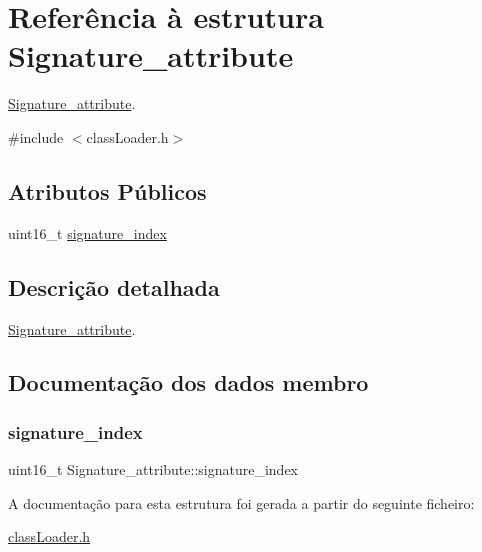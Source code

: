 \hypertarget{struct_signature__attribute}{}\section{Referência à estrutura Signature\+\_\+attribute}
\label{struct_signature__attribute}


\hyperlink{struct_signature__attribute}{Signature\+\_\+attribute}.  




{\ttfamily \#include $<$class\+Loader.\+h$>$}

\subsection*{Atributos Públicos}
\begin{DoxyCompactItemize}
\item 
uint16\+\_\+t \hyperlink{struct_signature__attribute_a2d20fd92e0d5a65817423a45e1864ee3}{signature\+\_\+index}
\end{DoxyCompactItemize}


\subsection{Descrição detalhada}
\hyperlink{struct_signature__attribute}{Signature\+\_\+attribute}. 

\subsection{Documentação dos dados membro}
\hypertarget{struct_signature__attribute_a2d20fd92e0d5a65817423a45e1864ee3}{}\label{struct_signature__attribute_a2d20fd92e0d5a65817423a45e1864ee3} 
\subsubsection{\texorpdfstring{signature\+\_\+index}{signature\_index}}
{\footnotesize\ttfamily uint16\+\_\+t Signature\+\_\+attribute\+::signature\+\_\+index}



A documentação para esta estrutura foi gerada a partir do seguinte ficheiro\+:\begin{DoxyCompactItemize}
\item 
\hyperlink{class_loader_8h}{class\+Loader.\+h}\end{DoxyCompactItemize}
